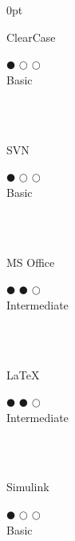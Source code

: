 \documentclass[a4paper]{article}
\begin{document}
\begin{adjustwidth}{\parindent}{0pt}
\begin{minipage}[t]{0.25\textwidth}
 \begin{minipage}{0.65\textwidth}
   \small{ClearCase}
 \end{minipage}
 \begin{minipage}{0.3\textwidth}
   \centering $\mdlgblkcircle$ $\mdlgwhtcircle$ $\mdlgwhtcircle$ \\  \footnotesize{Basic}
 \end{minipage} \\ \hspace{0pt} \\

 \begin{minipage}{0.65\textwidth}
  \small{SVN}
 \end{minipage}
 \begin{minipage}{0.3\textwidth}
  \centering $\mdlgblkcircle$ $\mdlgwhtcircle$ $\mdlgwhtcircle$ \\  \footnotesize{Basic}
 \end{minipage} \\ \hspace{0pt} \\
 
 \begin{minipage}{0.65\textwidth}
   \small{MS Office}
 \end{minipage}
 \begin{minipage}{0.3\textwidth}
   \centering $\mdlgblkcircle$ $\mdlgblkcircle$ $\mdlgwhtcircle$ \\  \footnotesize{\mbox{Intermediate}}
 \end{minipage} \\ \hspace{0pt} \\
 
 \begin{minipage}{0.65\textwidth}
   \small{\LaTeX}
 \end{minipage}
 \begin{minipage}{0.3\textwidth}
   \centering $\mdlgblkcircle$ $\mdlgblkcircle$ $\mdlgwhtcircle$ \\  \footnotesize{\mbox{Intermediate}}
 \end{minipage} \\ \hspace{0pt} \\
 
 \begin{minipage}{0.65\textwidth}
   \small{Simulink}
 \end{minipage}
 \begin{minipage}{0.3\textwidth}
   \centering $\mdlgblkcircle$ $\mdlgwhtcircle$ $\mdlgwhtcircle$ \\  \footnotesize{Basic}
 \end{minipage} \\ \hspace{0pt} \\
 

\end{minipage}
\end{adjustwidth}
\end{document}
